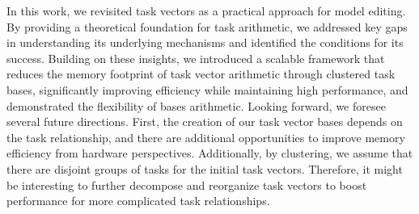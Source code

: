 In this work, we revisited task vectors as a practical approach for model editing. By providing a theoretical foundation for task arithmetic, we addressed key gaps in understanding its underlying mechanisms and identified the conditions for its success. Building on these insights, we introduced a scalable framework that reduces the memory footprint of task vector arithmetic through clustered task bases, significantly improving efficiency while maintaining high performance, and demonstrated the flexibility of bases arithmetic. Looking forward, we foresee several future directions. First, the creation of our task vector bases depends on the task relationship, and there are additional opportunities to improve memory efficiency from hardware perspectives. Additionally, by clustering, we assume that there are disjoint groups of tasks for the initial task vectors. Therefore, it might be interesting to further decompose and reorganize task vectors to boost performance for more complicated task relationships.
